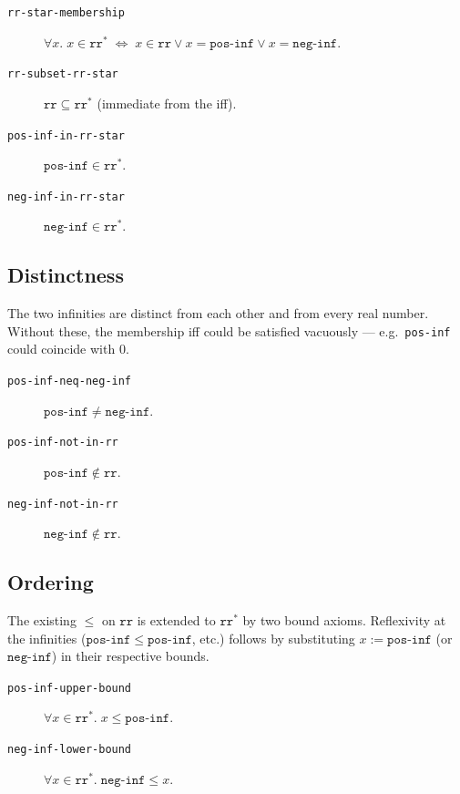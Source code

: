 \begin{description}
\item[\texttt{rr-star-membership}]
  $\forall x.\; x \in \mathtt{rr}^{*} \;\Leftrightarrow\;
   x \in \mathtt{rr} \lor x = \mathtt{pos\text{-}inf}
                     \lor x = \mathtt{neg\text{-}inf}.$
\item[\texttt{rr-subset-rr-star}]
  $\mathtt{rr} \subseteq \mathtt{rr}^{*}$ (immediate from the iff).
\item[\texttt{pos-inf-in-rr-star}]
  $\mathtt{pos\text{-}inf} \in \mathtt{rr}^{*}$.
\item[\texttt{neg-inf-in-rr-star}]
  $\mathtt{neg\text{-}inf} \in \mathtt{rr}^{*}$.
\end{description}

\subsection{Distinctness}

The two infinities are distinct from each other and from every real
number.  Without these, the membership iff could be satisfied
vacuously --- e.g.\ \texttt{pos-inf} could coincide with $0$.
\begin{description}
\item[\texttt{pos-inf-neq-neg-inf}]
  $\mathtt{pos\text{-}inf} \neq \mathtt{neg\text{-}inf}$.
\item[\texttt{pos-inf-not-in-rr}]
  $\mathtt{pos\text{-}inf} \notin \mathtt{rr}$.
\item[\texttt{neg-inf-not-in-rr}]
  $\mathtt{neg\text{-}inf} \notin \mathtt{rr}$.
\end{description}

\subsection{Ordering}

The existing $\le$ on $\mathtt{rr}$ is extended to $\mathtt{rr}^{*}$ by
two bound axioms.  Reflexivity at the infinities ($\mathtt{pos\text{-}inf}
\le \mathtt{pos\text{-}inf}$, etc.) follows by substituting
$x := \mathtt{pos\text{-}inf}$ (or $\mathtt{neg\text{-}inf}$) in their
respective bounds.
\begin{description}
\item[\texttt{pos-inf-upper-bound}]
  $\forall x \in \mathtt{rr}^{*}.\; x \le \mathtt{pos\text{-}inf}.$
\item[\texttt{neg-inf-lower-bound}]
  $\forall x \in \mathtt{rr}^{*}.\; \mathtt{neg\text{-}inf} \le x.$
\end{description}

